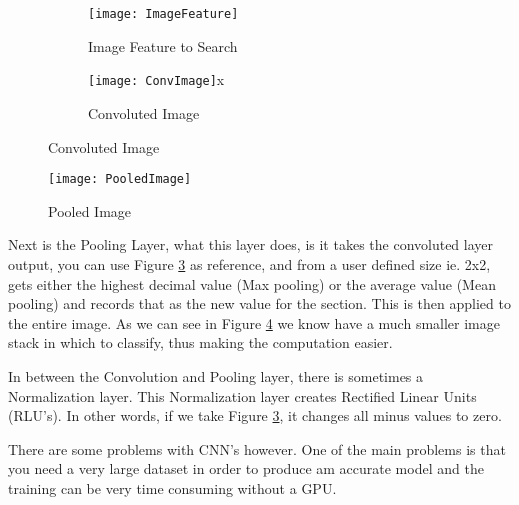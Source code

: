 \begin{figure}
    \caption{Image Convolution}  
    \begin{subfigure}[b]{0.4\textwidth}
          \texttt{[image: ImageFeature]}
          \caption{Image Feature to Search}
          \label{fig:feature}
      \end{subfigure}
      \begin{subfigure}[b]{0.4\textwidth}
           \texttt{[image: ConvImage]}x
           \caption{Convoluted Image}
           \label{fig:convoluted}
      \end{subfigure}
\end{figure}
\begin{figure}
    \texttt{[image: PooledImage]}
    \caption{Pooled Image}
    \label{fig:pooled}
\end{figure}
Next is the Pooling Layer, what this layer does, is it takes the convoluted
layer output, you can use Figure \ref{fig:convoluted} as reference, and from a
user defined size ie. 2x2, gets either the highest decimal value (Max pooling)
or the average value (Mean pooling) and records that as the new value for the
section. This is then applied to the entire image. As we can see in Figure
\ref{fig:pooled} we know have a much smaller image stack in which to classify,
thus making the computation easier.

In between the Convolution and Pooling layer, there is sometimes a Normalization
layer. This Normalization layer creates Rectified Linear Units (RLU's). In other
words, if we take Figure \ref{fig:convoluted}, it changes all minus values to
zero.

There are some problems with CNN's however. One of the main problems is that you
need a very large dataset in order to produce am accurate model and the training
can be very time consuming without a GPU.
